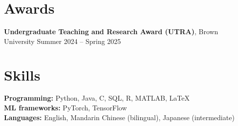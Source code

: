 \documentclass[10pt,letterpaper]{article}
\begin{document}
\section{Awards}
\textbf{Undergraduate Teaching and Research Award (UTRA)}, Brown University \hfill Summer 2024 -- Spring 2025

\section{Skills}
\textbf{Programming:} Python, Java, C, SQL, R, MATLAB, \LaTeX\\
\textbf{ML frameworks:} PyTorch, TensorFlow\\
\textbf{Languages:} English, Mandarin Chinese (bilingual), Japanese (intermediate)
\end{document}
